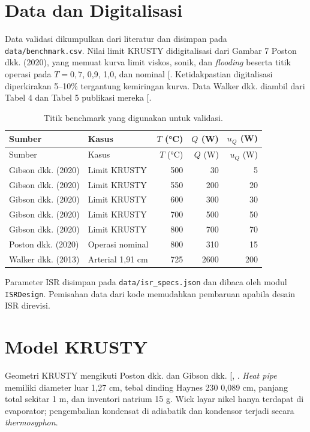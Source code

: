 \documentclass[
  indonesian,
  12pt,
  a4paper,
]{report}
\begin{document}
\section{Data dan Digitalisasi}\label{data-dan-digitalisasi}

Data validasi dikumpulkan dari literatur dan disimpan pada
\texttt{data/benchmark.csv}. Nilai limit KRUSTY didigitalisasi dari
Gambar 7 Poston dkk. (2020), yang memuat kurva limit viskos, sonik, dan
\emph{flooding} beserta titik operasi pada \(T=0{,}7\), 0,9, 1,0, dan
nominal {[}\citeproc{ref-poston2020results}{5}{]}. Ketidakpastian
digitalisasi diperkirakan 5--10\% tergantung kemiringan kurva. Data
Walker dkk. diambil dari Tabel 4 dan Tabel 5 publikasi mereka
{[}\citeproc{ref-walker2013}{12}{]}.

\begin{longtable}[]{@{}llrrr@{}}
\caption{Titik benchmark yang digunakan untuk
validasi.}\label{tbl-bench}\tabularnewline
\toprule\noalign{}
Sumber & Kasus & \(T\) (°C) & \(Q\) (W) & \(u_Q\) (W) \\
\midrule\noalign{}
\endfirsthead
\toprule\noalign{}
Sumber & Kasus & \(T\) (°C) & \(Q\) (W) & \(u_Q\) (W) \\
\midrule\noalign{}
\endhead
\bottomrule\noalign{}
\endlastfoot
Gibson dkk. (2020) & Limit KRUSTY & 500 & 30 & 5 \\
Gibson dkk. (2020) & Limit KRUSTY & 550 & 200 & 20 \\
Gibson dkk. (2020) & Limit KRUSTY & 600 & 300 & 30 \\
Gibson dkk. (2020) & Limit KRUSTY & 700 & 500 & 50 \\
Gibson dkk. (2020) & Limit KRUSTY & 800 & 700 & 70 \\
Poston dkk. (2020) & Operasi nominal & 800 & 310 & 15 \\
Walker dkk. (2013) & Arterial 1,91 cm & 725 & 2600 & 200 \\
\end{longtable}

Parameter ISR disimpan pada \texttt{data/isr\_specs.json} dan dibaca
oleh modul \texttt{ISRDesign}. Pemisahan data dari kode memudahkan
pembaruan apabila desain ISR direvisi.

\section{Model KRUSTY}\label{model-krusty}

Geometri KRUSTY mengikuti Poston dkk. dan Gibson dkk.
{[}, \citeproc{ref-gibson2020}{6}{]}.
\emph{Heat pipe} memiliki diameter luar 1,27 cm, tebal dinding Haynes
230 0,089 cm, panjang total sekitar 1 m, dan inventori natrium 15 g.
Wick layar nikel hanya terdapat di evaporator; pengembalian kondensat di
adiabatik dan kondensor terjadi secara \emph{thermosyphon}.
\end{document}
